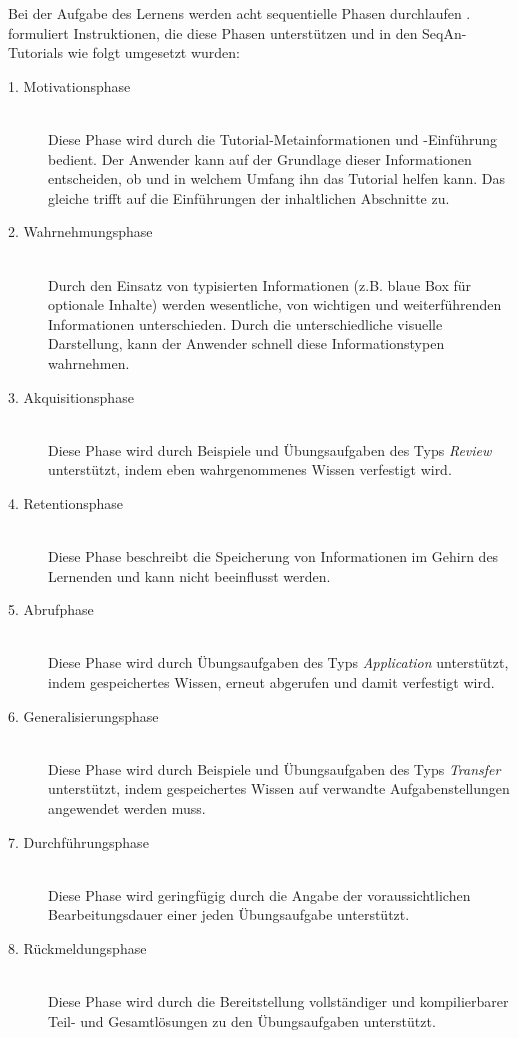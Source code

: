 Bei der Aufgabe des Lernens werden acht sequentielle Phasen durchlaufen \citep{Gagne:1985tx,aggarwal2009essentials}. \cite{Reardon:2008wl} formuliert Instruktionen, die diese Phasen unterstützen und in den SeqAn-Tutorials wie folgt umgesetzt wurden: 

\begin{description}
  \item[1. Motivationsphase] \hfill \\
  Diese Phase wird durch die Tutorial-Metainformationen und -Einführung bedient. Der Anwender kann auf der Grundlage dieser Informationen entscheiden, ob und in welchem Umfang ihn das Tutorial helfen kann. Das gleiche trifft auf die Einführungen der inhaltlichen Abschnitte zu.
  \item[2. Wahrnehmungsphase] \hfill \\
  Durch den Einsatz von typisierten Informationen (z.B. blaue Box für optionale Inhalte) werden wesentliche, von wichtigen und weiterführenden Informationen unterschieden. Durch die unterschiedliche visuelle Darstellung, kann der Anwender schnell diese Informationstypen wahrnehmen.
  \item[3. Akquisitionsphase] \hfill \\
  Diese Phase wird durch Beispiele und Übungsaufgaben des Typs \textit{Review} unterstützt, indem eben wahrgenommenes Wissen verfestigt wird.
  \item[4. Retentionsphase] \hfill \\
  Diese Phase beschreibt die Speicherung von Informationen im Gehirn des Lernenden und kann nicht beeinflusst werden.
  \item[5. Abrufphase] \hfill \\
  Diese Phase wird durch Übungsaufgaben des Typs \textit{Application} unterstützt, indem gespeichertes Wissen, erneut abgerufen und damit verfestigt wird.
  \item[6. Generalisierungsphase] \hfill \\
  Diese Phase wird durch Beispiele und Übungsaufgaben des Typs \textit{Transfer} unterstützt, indem gespeichertes Wissen auf verwandte Aufgabenstellungen angewendet werden muss.
  \item[7. Durchführungsphase] \hfill \\
  Diese Phase wird geringfügig durch die Angabe der voraussichtlichen Bearbeitungsdauer einer jeden Übungsaufgabe unterstützt.
  \item[8. Rückmeldungsphase] \hfill \\
  Diese Phase wird durch die Bereitstellung vollständiger und kompilierbarer Teil- und Gesamtlösungen zu den Übungsaufgaben unterstützt.
\end{description}

